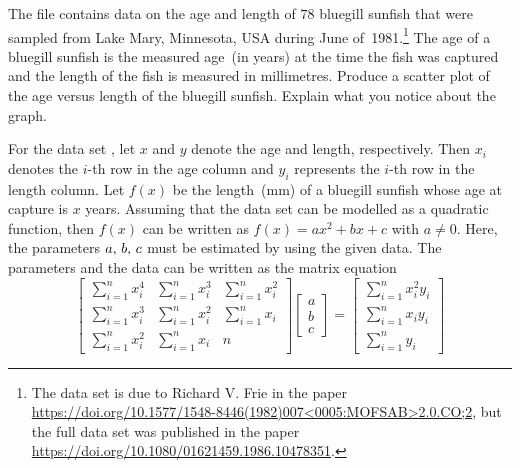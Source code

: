 \documentclass[a4paper,oneside,12pt]{article}
\begin{document}
\begin{problem}
\begin{packedenum}
  \item\label{subprob:quadratic_applications:bluegill_data}
    The file  contains data on the age and length
    of $78$ bluegill sunfish that were sampled from Lake Mary,
    Minnesota, USA during June of~1981.\footnote{
      The data set is due to Richard V. Frie in the paper
      \url{https://doi.org/10.1577/1548-8446(1982)007<0005:MOFSAB>2.0.CO;2},
      but the full data set was published in the paper
      \url{https://doi.org/10.1080/01621459.1986.10478351}.
    }
    The age of a bluegill sunfish is the measured age~(in years) at
    the time the fish was captured and the length of the fish is
    measured in millimetres.  Produce a scatter plot of the age versus
    length of the bluegill sunfish.  Explain what you notice about the
    graph.

  \item\label{subprob:quadratic_applications:bluegill_regression}
    For the data set , let $x$ and $y$ denote the
    age and length, respectively.  Then $x_i$ denotes the $i$-th row
    in the age column and $y_i$ represents the $i$-th row in the
    length column.  Let $f(x)$ be the length~(mm) of a bluegill
    sunfish whose age at capture is $x$ years.  Assuming that the data
    set can be modelled as a quadratic function, then $f(x)$ can be
    written as $f(x) = ax^2 + bx + c$ with $a \neq 0$.  Here, the
    parameters ${a},\, {b},\, {c}$ must be estimated by using the given
    data.  The parameters and the data can be written as the matrix
    equation
    \begin{equation}
    \label{eqn:quadratic_applications:bluegill_matrix_equation}
    \begin{bmatrix}
    \sum_{i=1}^n x_i^4 & \sum_{i=1}^n x_i^3 & \sum_{i=1}^n x_i^2 \\[4pt]
    \sum_{i=1}^n x_i^3 & \sum_{i=1}^n x_i^2 & \sum_{i=1}^n x_i   \\[4pt]
    \sum_{i=1}^n x_i^2 & \sum_{i=1}^n x_i   & n
    \end{bmatrix}
    \begin{bmatrix}
    a \\[4pt]
    b \\[4pt]
    c
    \end{bmatrix}
    =
    \begin{bmatrix}
    \sum_{i=1}^n x_i^2 y_i \\[4pt]
    \sum_{i=1}^n x_i y_i \\[4pt]
    \sum_{i=1}^n y_i
    \end{bmatrix}

\end{equation}
\end{packedenum}
\end{problem}
\end{document}
